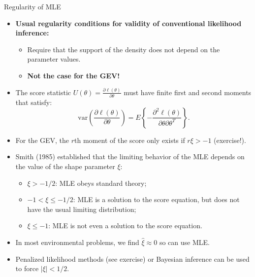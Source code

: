 \documentclass[10pt, hyperref={colorlinks = true,linkcolor = blue}]{beamer}
\begin{document}
{{\begin{frame}{Regularity of MLE}
\footnotesize
\begin{itemize}
    \item \textbf{Usual regularity conditions for validity of conventional likelihood inference:}
    \begin{itemize}
        \item Require that the support of the density does not depend on the parameter values.
        \item \textbf{Not the case for the GEV!}
    \end{itemize}

    \item The score statistic \( U(\theta) = \frac{\partial \ell(\theta)}{\partial \theta} \) must have finite first and second moments that satisfy:
    \[
    \text{var}\left( \frac{\partial \ell(\theta)}{\partial \theta} \right) = E\left\{ -\frac{\partial^2 \ell(\theta)}{\partial \theta \partial \theta^T} \right\}.
    \]

    \item For the GEV, the \(r\)th moment of the score only exists if \( r\xi > -1 \) (exercise!).

    \item Smith (1985) established that the limiting behavior of the MLE depends on the value of the shape parameter \(\xi\):
    \begin{itemize}
        \item \(\xi > -1/2\): MLE obeys standard theory;
        \item \(-1 < \xi \leq -1/2\): MLE is a solution to the score equation, but does not have the usual limiting distribution;
        \item \(\xi \leq -1\): MLE is not even a solution to the score equation.
    \end{itemize}

    \item In most environmental problems, we find \(\hat{\xi} \approx 0\) so can use MLE.

    \item Penalized likelihood methods (see exercise) or Bayesian inference can be used to force \(|\xi| < 1/2\).
\end{itemize}

\end{frame}

}


}
\end{document}
